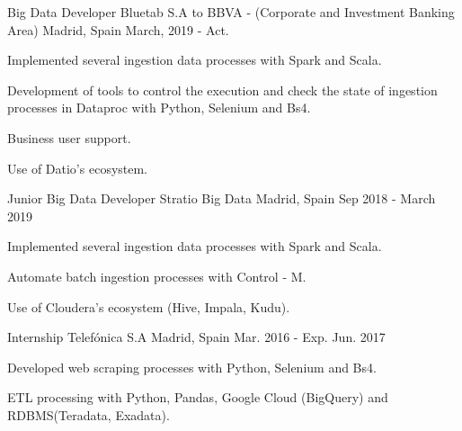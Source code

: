 

\begin{cventries}

  \cventry
    {Big Data Developer} %
    {Bluetab S.A to BBVA - (Corporate and Investment Banking Area)} %
    {Madrid, Spain} %
    {March, 2019 - Act.} %
    {
      \begin{cvitems} %
        \item {Implemented several ingestion data processes with Spark and Scala.}
        \item {Development of tools to control the execution and check the state of ingestion processes in Dataproc with Python, Selenium and Bs4.}
        \item {Business user support.}
        \item {Use of Datio's ecosystem.}
      \end{cvitems}
    }

  \cventry
    {Junior Big Data Developer} %
    {Stratio Big Data} %
    {Madrid, Spain} %
    {Sep 2018 - March 2019} %
    {
      \begin{cvitems} %
        \item {Implemented several ingestion data processes with Spark and Scala.}
        \item {Automate batch ingestion processes with Control - M.}
        \item {Use of Cloudera's ecosystem (Hive, Impala, Kudu).}
      \end{cvitems}
    }

  \cventry
    {Internship} %
    {Telefónica S.A} %
    {Madrid, Spain} %
    {Mar. 2016 - Exp. Jun. 2017} %
    {
      \begin{cvitems} %
        \item {Developed web scraping processes with Python, Selenium and Bs4.}
        \item {ETL processing with Python, Pandas, Google Cloud (BigQuery) and RDBMS(Teradata, Exadata).}
      \end{cvitems}
    }

\end{cventries}
